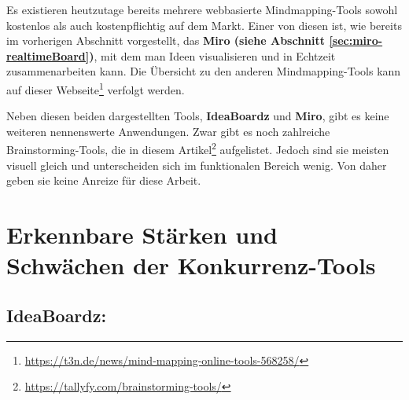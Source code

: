 Es existieren heutzutage bereits mehrere webbasierte Mindmapping-Tools sowohl kostenlos als auch kostenpflichtig auf dem Markt. Einer von diesen ist, wie bereits im vorherigen Abschnitt vorgestellt, das \textbf{Miro (siehe Abschnitt \ref{sec:miro-realtimeBoard})}, mit dem man Ideen visualisieren und in Echtzeit zusammenarbeiten kann. Die Übersicht zu den anderen Mindmapping-Tools kann auf dieser Webseite\footnote{\url{https://t3n.de/news/mind-mapping-online-tools-568258/}} verfolgt werden.

Neben diesen beiden dargestellten Tools, \textbf{IdeaBoardz} und \textbf{Miro}, gibt es keine weiteren nennenswerte Anwendungen. Zwar gibt es noch zahlreiche Brainstorming-Tools, die in diesem Artikel\footnote{\url{https://tallyfy.com/brainstorming-tools/}} aufgelistet. Jedoch sind sie meisten visuell gleich und unterscheiden sich im funktionalen Bereich wenig. Von daher geben sie keine Anreize für diese Arbeit. 

\newpage
\section{Erkennbare Stärken und Schwächen der Konkurrenz-Tools}
\label{sec:erkennbare stärken und schwächen der konkurrenzTools}
\subsection{IdeaBoardz:}
\label{sec:ideaBoardz stärken und schwächen}


